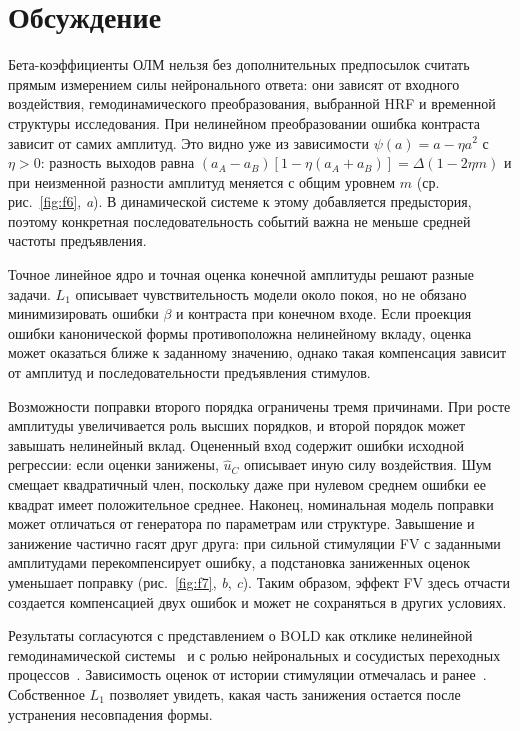 
\section{Обсуждение}

Бета-коэффициенты ОЛМ нельзя без дополнительных предпосылок считать прямым измерением силы нейронального ответа: они зависят от входного воздействия, гемодинамического преобразования, выбранной HRF и временной структуры исследования. При нелинейном преобразовании ошибка контраста зависит от самих амплитуд. Это видно уже из зависимости $\psi(a)=a-\eta a^2$ с $\eta>0$: разность выходов равна $(a_A-a_B)[1-\eta(a_A+a_B)]=\Delta(1-2\eta m)$ и при неизменной разности амплитуд меняется с общим уровнем $m$ (ср. рис.~\ref{fig:f6}, \textit{a}). В динамической системе к этому добавляется предыстория, поэтому конкретная последовательность событий важна не меньше средней частоты предъявления.

Точное линейное ядро и точная оценка конечной амплитуды решают разные задачи. $L_1$ описывает чувствительность модели около покоя, но не обязано минимизировать ошибки $\beta$ и контраста при конечном входе. Если проекция ошибки канонической формы противоположна нелинейному вкладу, оценка может оказаться ближе к заданному значению, однако такая компенсация зависит от амплитуд и последовательности предъявления стимулов.

Возможности поправки второго порядка ограничены тремя причинами. При росте амплитуды увеличивается роль высших порядков, и второй порядок может завышать нелинейный вклад. Оцененный вход содержит ошибки исходной регрессии: если оценки занижены, $\hat u_C$ описывает иную силу воздействия. Шум смещает квадратичный член, поскольку даже при нулевом среднем ошибки ее квадрат имеет положительное среднее. Наконец, номинальная модель поправки может отличаться от генератора по параметрам или структуре. Завышение и занижение частично гасят друг друга: при сильной стимуляции FV с заданными амплитудами перекомпенсирует ошибку, а подстановка заниженных оценок уменьшает поправку (рис.~\ref{fig:f7}, \textit{b}, \textit{c}). Таким образом, эффект FV здесь отчасти создается компенсацией двух ошибок и может не сохраняться в других условиях.

Результаты согласуются с представлением о BOLD как отклике нелинейной гемодинамической системы~\cite{friston2000,buxton2004} и с ролью нейрональных и сосудистых переходных процессов~\cite{havlicek2015}. Зависимость оценок от истории стимуляции отмечалась и ранее~\cite{wager2005}. Собственное $L_1$ позволяет увидеть, какая часть занижения остается после устранения несовпадения формы.

